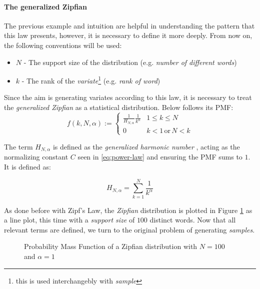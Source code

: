 \paragraph{The generalized Zipfian} The previous example and intuition are helpful in 
understanding the pattern that this law presents, however, it is necessary to define 
it more deeply. From now on, the following conventions will be used:

\begin{itemize}
    \item $N$ - The support size of the distribution (e.g. \textit{number of different words})
    \item $k$ - The rank of the \textit{variate}\footnote{this is used interchangebly with \textit{sample}} (e.g. \textit{rank of word})
\end{itemize}

Since the aim is generating variates according to this law, it is necessary to
 treat the \textit{generalized Zipfian} as a statistical distribution. Below follows its
\ac{PMF}:
\begin{equation}\label{eqt:zm_prob}
    f(k, N, \alpha) := 
 \begin{cases} 
      \frac{1}{H_{N,\alpha}} \frac{1}{k^\alpha} & 1 \leq k \leq N \\
      0 & k < 1 \, \text{or} \, N < k 
   \end{cases}
\end{equation}

The term $H_{N,\alpha}$ is defined as the \textit{generalized harmonic number} \cite{newmanPowerLawsPareto2005}, acting as the normalizing constant $C$ 
seen in \ref{eq:power-law} and ensuring the \ac{PMF} sums to $1$. It is defined as:

\begin{equation}\label{eqt:generalized_hn}
    H_{N, \alpha} = \sum_{k = 1}^{N} \frac{1}{k^\alpha}
\end{equation}

As done before with Zipf's Law, the \textit{Zipfian} distribution is plotted in Figure \ref{fig:zipf_pmf} as a line plot, this time with a \textit{support size} of $100$ distinct words. 
Now that all relevant terms are defined, we turn to the original problem of generating \textit{samples}.

\begin{figure}[t]
    \centering
    
    \caption{Probability Mass Function of a Zipfian distribution with $N = 100$ and $\alpha = 1$}
    \label{fig:zipf_pmf}
\end{figure}

